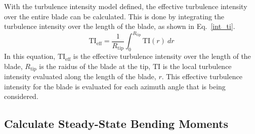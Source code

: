 \documentclass[11pt,letterpaper]{article}
\begin{document}
With the turbulence intensity model defined, the effective turbulence intensity over the entire blade can be calculated. This is done by integrating the turbulence intensity over the length of the blade, as shown in Eq.~\ref{int_ti}.
%
\begin{equation}
    \label{int_ti}
    \text{TI}_{\text{eff}} = \frac{1}{R_{\text{tip}}}\int_0^{R_\text{tip}} \text{TI}(r)~dr
\end{equation}
%
In this equation, $\text{TI}_{\text{eff}}$ is the effective turbulence intensity over the length of the blade, $R_{\text{tip}}$ is the raidus of the blade at the tip, $\text{TI}$ is the local turbulence intensity evaluated along the length of the blade, $r$. This effective turbulence intensity for the blade is evaluated for each azimuth angle that is being considered.

\subsection{Calculate Steady-State Bending Moments}
\end{document}
